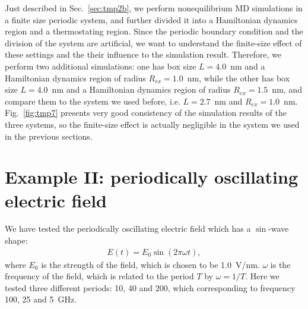 \documentclass[aip,jcp,a4paper,preprint,onecolumn]{revtex4-1}
\begin{document}
Just described in Sec.~\ref{sec:tmp2b}, we perform nonequilibrium MD
simulations in a finite size periodic system, and further divided it
into a Hamiltonian dynamics region and a thermostating region.
Since the periodic boundary condition and the division of the system
are artificial, 
we want to understand the finite-size effect of
these settings and the their influence to the simulation result.
Therefore, we
perform two additional simulations: one has box size $L=4.0$~nm and a
Hamiltonian dynamics region of radius $R_{ex} = 1.0$~nm, while the
other has box size $L=4.0$~nm and a Hamiltonian dynamics region of
radius $R_{ex} = 1.5$~nm, and compare them to the system
we used before, i.e. $L=2.7$~nm and $R_{ex} = 1.0$~nm.
Fig.~\ref{fig:tmp7} presents very good consistency of
the simulation results of the three systems, so the finite-size effect is
actually negligible in the system we used in the previous sections.



\section{Example II:
  periodically oscillating electric field}

We have tested the periodically oscillating electric field which has
a $\sin$-wave shape:
\begin{align}
  E(t) = E_0\sin(2\pi \omega t),
\end{align}
where $E_0$ is the strength of the field, which is chosen to be
1.0~V/nm.  $\omega$ is the frequency of the field, which is related to
the period $T$ by $\omega = 1/T$.  Here we tested three different
periods: 10, 40 and 200, which corresponding
to frequency 100, 25 and 5~GHz.
\end{document}
